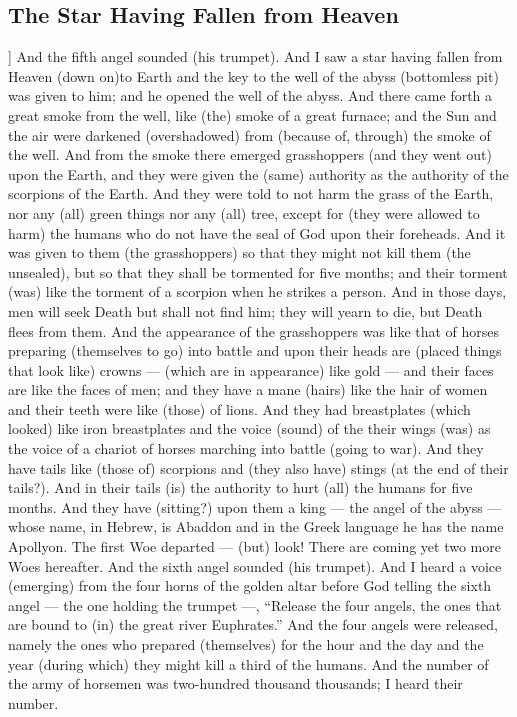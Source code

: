 \begin{pages}
\begin{Leftside}
        			\chapter{The Star Having Fallen from Heaven}
				]
		And the fifth angel sounded (his trumpet). And I saw a star having fallen from Heaven (down on)to Earth and the key to the well of the abyss (bottomless pit) was given to him; and he opened the well of the abyss. And there came forth a great smoke from the well, like (the) smoke of a great furnace; and the Sun and the air were darkened (overshadowed) from (because of, through) the smoke of the well. 
		\pend
		\pstart
		And from the smoke there emerged grasshoppers (and they went out) upon the Earth, and they were given the (same) authority as the authority of the scorpions of the Earth. And they were told to not harm the grass of the Earth, nor any (all) green things nor any (all) tree, except for (they were allowed to harm) the humans who do not have the seal of God upon their foreheads. 
		\pend
		\pstart
		And it was given to them (the grasshoppers) so that they might not kill them (the unsealed), but so that they shall be tormented for five months; and their torment (was) like the torment of a scorpion when he strikes a person. And in those days, men will seek Death but shall not find him; they will yearn to die, but 	Death flees from them. 
		\pend
		\pstart
		And the appearance of the grasshoppers was like that of horses preparing (themselves to go) into battle and upon their heads are (placed things that look like) crowns — (which are in appearance) like gold — and their faces are like the faces of men; and they have a mane (hairs) like the hair of women and their teeth were like (those) of lions. And they had breastplates (which looked) like iron breastplates and the voice (sound) of the their wings (was) as the voice of a chariot of horses marching into battle (going to war). 
		\pend
		\pstart
		And they have tails like (those of) scorpions and (they also have) stings (at the end of their tails?). And in their tails (is) the authority to hurt (all) the humans for five months. And they have (sitting?) upon them a king — the angel of the abyss — whose name, in Hebrew, is Abaddon and in the Greek language he has the name Apollyon. The first Woe departed — (but) look! There are coming yet two more Woes hereafter. 
		\pend
		\pstart
		And the sixth angel sounded (his trumpet). And I heard a voice (emerging) from the four horns of the golden altar before God telling the sixth angel — the one holding the trumpet —, “Release the four angels, the ones that are bound to (in) the great river Euphrates.” And the four angels were released, namely the ones who prepared (themselves) for the hour and the day and the year (during which) they might kill a third of the humans. And the number of the army of horsemen was two-hundred thousand thousands; I heard their number.

\end{Leftside}
\end{pages}
